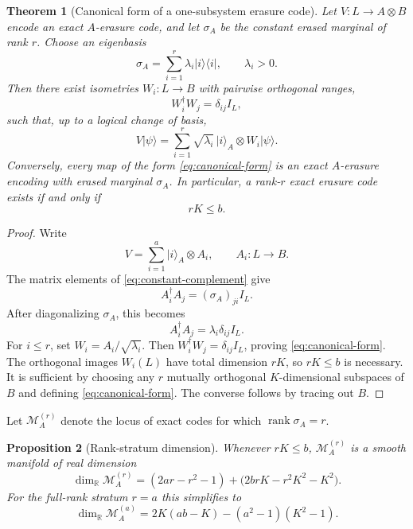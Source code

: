 \documentclass[11pt]{article}
\newtheorem{theorem}{Theorem}[section]
\newtheorem{proposition}[theorem]{Proposition}
\theoremstyle{definition}
\newcommand{\cM}{\mathcal M}
\newcommand{\rank}{\operatorname{rank}}
\newcommand{\R}{\mathbb R}
\newcommand{\1}{\mathbf 1}
\newcommand{\ket}[1]{\lvert #1\rangle}
\newcommand{\bra}[1]{\langle #1\rvert}
\begin{document}
\begin{theorem}[Canonical form of a one-subsystem erasure code]
\label{thm:canonical}
Let $V:L\to A\otimes B$ encode an exact $A$-erasure code, and let $\sigma_A$ be the constant erased marginal of rank $r$.  Choose an eigenbasis
\[
\sigma_A=\sum_{i=1}^r\lambda_i\ket{i}\bra{i},
\qquad \lambda_i>0.
\]
Then there exist isometries $W_i:L\to B$ with pairwise orthogonal ranges,
\[
W_i^\dagger W_j=\delta_{ij}I_L,
\]
such that, up to a logical change of basis,
\begin{equation}
V\ket{\psi}
=\sum_{i=1}^r\sqrt{\lambda_i}\,
\ket{i}_A\otimes W_i\ket{\psi}.
\label{eq:canonical-form}
\end{equation}
Conversely, every map of the form \eqref{eq:canonical-form} is an exact $A$-erasure encoding with erased marginal $\sigma_A$.
In particular, a rank-$r$ exact erasure code exists if and only if
\begin{equation}
rK\le b.
\label{eq:existence-rank}
\end{equation}
\end{theorem}

\begin{proof}
Write
\[
V=\sum_{i=1}^a\ket{i}_A\otimes A_i,
\qquad A_i:L\to B.
\]
The matrix elements of \eqref{eq:constant-complement} give
\[
A_i^\dagger A_j=(\sigma_A)_{ji}I_L.
\]
After diagonalizing $\sigma_A$, this becomes
\[
A_i^\dagger A_j=\lambda_i\delta_{ij}I_L.
\]
For $i\le r$, set $W_i=A_i/\sqrt{\lambda_i}$.  Then $W_i^\dagger W_j=\delta_{ij}I_L$, proving \eqref{eq:canonical-form}.  The orthogonal images $W_i(L)$ have total dimension $rK$, so $rK\le b$ is necessary.  It is sufficient by choosing any $r$ mutually orthogonal $K$-dimensional subspaces of $B$ and defining \eqref{eq:canonical-form}.  The converse follows by tracing out $B$.
\end{proof}

Let $\cM_A^{(r)}$ denote the locus of exact codes for which $\rank\sigma_A=r$.

\begin{proposition}[Rank-stratum dimension]
\label{prop:rank-stratum}
Whenever $rK\le b$, $\cM_A^{(r)}$ is a smooth manifold of real dimension
\begin{equation}
\dim_{\R}\cM_A^{(r)}
=
(2ar-r^2-1)
+
\bigl(2brK-r^2K^2-K^2\bigr).
\label{eq:rank-stratum-dim}
\end{equation}
For the full-rank stratum $r=a$ this simplifies to
\begin{equation}
\dim_{\R}\cM_A^{(a)}
=2K(ab-K)-(a^2-1)(K^2-1).
\label{eq:full-rank-dim}
\end{equation}
\end{proposition}
\end{document}
